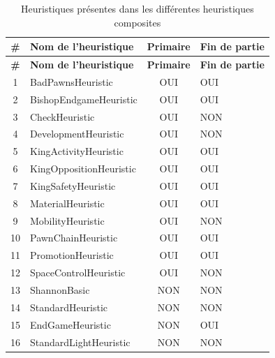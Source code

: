 \documentclass{article}
\begin{document}
\begin{longtable}{|c|p{5cm}|c|p{5cm}|}
    \caption{Heuristiques présentes dans les différentes heuristiques composites \label{heur}} \\
    \hline
    \textbf{\#} & \textbf{Nom de l'heuristique} & \textbf{Primaire} & \textbf{Fin de partie} \\
    \hline
    \endfirsthead

    \hline
    \textbf{\#} & \textbf{Nom de l'heuristique} & \textbf{Primaire} & \textbf{Fin de partie} \\
    \hline
    \endhead

    \hline
    1 & BadPawnsHeuristic & OUI & OUI \\
    \hline
    2 & BishopEndgameHeuristic & OUI & OUI \\
    \hline
    3 & CheckHeuristic & OUI & NON \\
    \hline
    4 & DevelopmentHeuristic & OUI & NON \\
    \hline
    5 & KingActivityHeuristic & OUI & OUI \\
    \hline
    6 & KingOppositionHeuristic & OUI & OUI \\
    \hline
    7 & KingSafetyHeuristic & OUI & OUI \\
    \hline
    8 & MaterialHeuristic & OUI & OUI \\
    \hline
    9 & MobilityHeuristic & OUI & NON \\
    \hline
    10 & PawnChainHeuristic & OUI & OUI \\
    \hline
    11 & PromotionHeuristic & OUI & OUI \\
    \hline
    12 & SpaceControlHeuristic & OUI & NON \\
    \hline
    13 & ShannonBasic & NON & NON \\
    \hline
    14 & StandardHeuristic & NON & NON \\
    \hline
    15 & EndGameHeuristic & NON & OUI \\
    \hline
    16 & StandardLightHeuristic & NON & NON \\
    \hline
\end{longtable}
\end{document}
